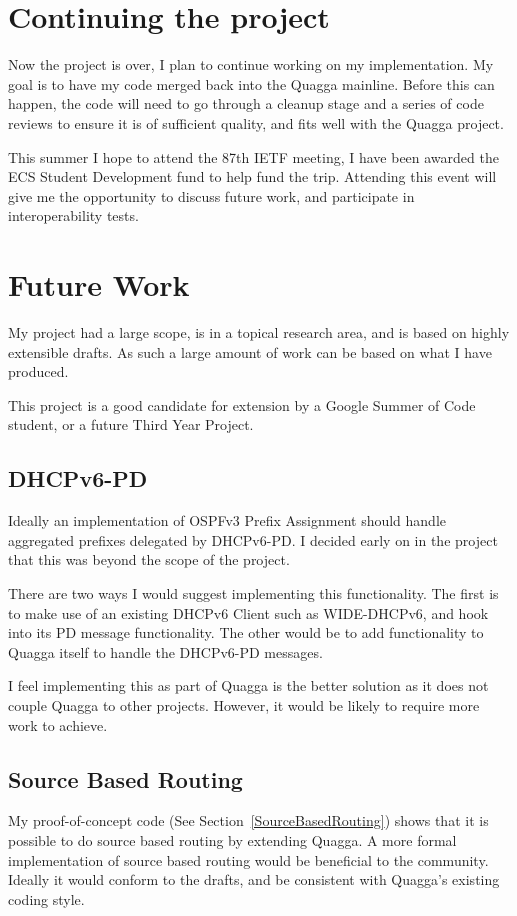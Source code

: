 \documentclass[12pt,a4paper,twoside]{report}
\begin{document}
\section{Continuing the project}
Now the project is over, I plan to continue working on my implementation. My
goal is to have my code merged back into the Quagga mainline. Before this can
happen, the code will need to go through a cleanup stage and a series of code
reviews to ensure it is of sufficient quality, and fits well with the Quagga
project.

This summer I hope to attend the 87th IETF meeting, I have been awarded
the ECS Student Development fund to help fund the trip. Attending this event
will give me the opportunity to discuss future work, and participate in
interoperability tests.

\section{Future Work}
My project had a large scope, is in a topical research area, and is based on
highly extensible drafts. As such a large amount of work can be based on what I
have produced. 

This project is a good candidate for extension by a Google Summer of Code
student, or a future Third Year Project. 

\subsection{DHCPv6-PD}
Ideally an implementation of OSPFv3 Prefix Assignment should handle aggregated
prefixes delegated by DHCPv6-PD\@. I decided early on in the project that this
was beyond the scope of the project. 

There are two ways I would suggest implementing this functionality. The first
is to make use of an existing DHCPv6 Client such as WIDE-DHCPv6, and hook into
its PD message functionality. The other would be to add functionality to Quagga
itself to handle the DHCPv6-PD messages. 

I feel implementing this as part of Quagga is the better solution as it does
not couple Quagga to other projects. However, it would be likely to require
more work to achieve.

\subsection{Source Based Routing} 
My proof-of-concept code (See Section~\ref{SourceBasedRouting}) shows that it
is possible to do source based routing by extending Quagga. A more formal
implementation of source based routing would be beneficial to the community.
Ideally it would conform to the drafts, and be consistent with Quagga's
existing coding style. 
\end{document}
